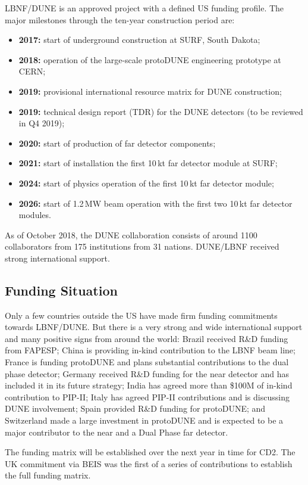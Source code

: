 LBNF/DUNE is an approved project with a defined US funding profile. The major milestones through the ten-year construction period are:
\begin{itemize}
     \item {\bf 2017:} start of underground construction at SURF, South Dakota;
     \item {\bf 2018:} operation of the large-scale protoDUNE engineering prototype at CERN; 
     \item {\bf 2019:} provisional international resource matrix for DUNE construction;
     \item {\bf 2019:} technical design report (TDR) for the DUNE detectors (to be reviewed in Q4 2019);
     \item {\bf 2020:} start of production of far detector components;
     \item {\bf 2021:} start of installation the first 10\,kt far detector module at SURF; 
     \item {\bf 2024:} start of physics operation of the first 10\,kt far detector module;
     \item {\bf 2026:} start of 1.2\,MW beam operation with the first two 10\,kt far detector modules.  
\end{itemize}
As of October 2018, the DUNE collaboration consists of around 1100 collaborators from 175 institutions from 31 nations. DUNE/LBNF received strong international support. 

\subsection{Funding Situation}
Only a few countries outside the US have made firm funding commitments towards LBNF/DUNE. But there is a very strong and wide international support and many positive signs from around the world: 
Brazil received R\&D funding from FAPESP; China is providing in-kind contribution to the LBNF beam line; France is funding protoDUNE and plans substantial contributions to the dual phase detector; Germany received R\&D funding for the near detector and has included it in its future strategy; India has agreed more than \$100M of in-kind contribution to PIP-II; Italy has agreed PIP-II contributions and is discussing DUNE involvement; Spain provided R\&D funding for protoDUNE; and Switzerland made a large investment in protoDUNE and is expected to be a major contributor to the near and a Dual Phase far detector.

The funding matrix will be established over the next year in time for CD2. The UK commitment via BEIS was the first of a series of contributions to establish the full funding matrix.


